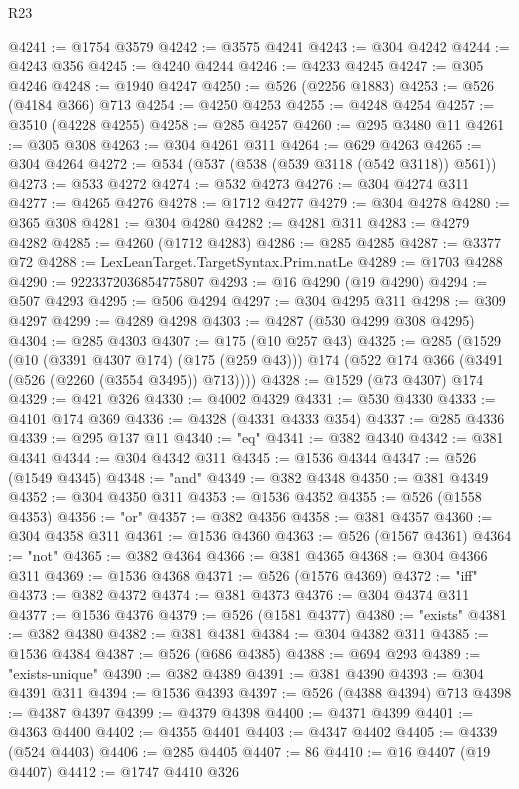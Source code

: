 \begin{lexlean}{R23}
\begin{coremodule}
@4241 := @1754 @3579
@4242 := @3575 @4241
@4243 := @304 @4242
@4244 := @4243 @356
@4245 := @4240 @4244
@4246 := @4233 @4245
@4247 := @305 @4246
@4248 := @1940 @4247
@4250 := @526 (@2256 @1883)
@4253 := @526 (@4184 @366) @713
@4254 := @4250 @4253
@4255 := @4248 @4254
@4257 := @3510 (@4228 @4255)
@4258 := @285 @4257
@4260 := @295 @3480 @11
@4261 := @305 @308
@4263 := @304 @4261 @311
@4264 := @629 @4263
@4265 := @304 @4264
@4272 := @534 (@537 (@538 (@539 @3118 (@542 @3118)) @561))
@4273 := @533 @4272
@4274 := @532 @4273
@4276 := @304 @4274 @311
@4277 := @4265 @4276
@4278 := @1712 @4277
@4279 := @304 @4278
@4280 := @365 @308
@4281 := @304 @4280
@4282 := @4281 @311
@4283 := @4279 @4282
@4285 := @4260 (@1712 @4283)
@4286 := @285 @4285
@4287 := @3377 @72
@4288 := LexLeanTarget.TargetSyntax.Prim.natLe
@4289 := @1703 @4288
@4290 := 9223372036854775807
@4293 := @16 @4290 (@19 @4290)
@4294 := @507 @4293
@4295 := @506 @4294
@4297 := @304 @4295 @311
@4298 := @309 @4297
@4299 := @4289 @4298
@4303 := @4287 (@530 @4299 @308 @4295)
@4304 := @285 @4303
@4307 := @175 (@10 @257 @43)
@4325 := @285
    (@1529
      (@10 (@3391 @4307 @174) (@175 (@259 @43)))
      @174
      (@522 @174 @366 (@3491 (@526 (@2260 (@3554 @3495)) @713))))
@4328 := @1529 (@73 @4307) @174
@4329 := @421 @326
@4330 := @4002 @4329
@4331 := @530 @4330
@4333 := @4101 @174 @369
@4336 := @4328 (@4331 @4333 @354)
@4337 := @285 @4336
@4339 := @295 @137 @11
@4340 := "eq"
@4341 := @382 @4340
@4342 := @381 @4341
@4344 := @304 @4342 @311
@4345 := @1536 @4344
@4347 := @526 (@1549 @4345)
@4348 := "and"
@4349 := @382 @4348
@4350 := @381 @4349
@4352 := @304 @4350 @311
@4353 := @1536 @4352
@4355 := @526 (@1558 @4353)
@4356 := "or"
@4357 := @382 @4356
@4358 := @381 @4357
@4360 := @304 @4358 @311
@4361 := @1536 @4360
@4363 := @526 (@1567 @4361)
@4364 := "not"
@4365 := @382 @4364
@4366 := @381 @4365
@4368 := @304 @4366 @311
@4369 := @1536 @4368
@4371 := @526 (@1576 @4369)
@4372 := "iff"
@4373 := @382 @4372
@4374 := @381 @4373
@4376 := @304 @4374 @311
@4377 := @1536 @4376
@4379 := @526 (@1581 @4377)
@4380 := "exists"
@4381 := @382 @4380
@4382 := @381 @4381
@4384 := @304 @4382 @311
@4385 := @1536 @4384
@4387 := @526 (@686 @4385)
@4388 := @694 @293
@4389 := "exists-unique"
@4390 := @382 @4389
@4391 := @381 @4390
@4393 := @304 @4391 @311
@4394 := @1536 @4393
@4397 := @526 (@4388 @4394) @713
@4398 := @4387 @4397
@4399 := @4379 @4398
@4400 := @4371 @4399
@4401 := @4363 @4400
@4402 := @4355 @4401
@4403 := @4347 @4402
@4405 := @4339 (@524 @4403)
@4406 := @285 @4405
@4407 := 86
@4410 := @16 @4407 (@19 @4407)
@4412 := @1747 @4410 @326

\end{coremodule}
\end{lexlean}
